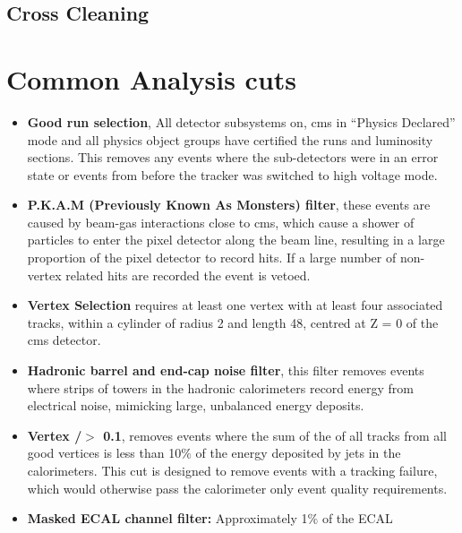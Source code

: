 \subsection{Cross Cleaning} %
\label{sub:cross_cleaning}

\section{Common Analysis cuts} %
\label{sec:common_analysis_cuts}



\begin{itemize}
\item \textbf{Good run selection}, All detector subsystems on, \ac{cms} in 
``Physics Declared'' mode and all physics object groups have certified the runs 
and luminosity sections. This removes any events where the sub-detectors were 
in an error state or events from before the tracker was switched to high 
voltage mode.
\item \textbf{P.K.A.M (Previously Known As Monsters) filter}, these events are 
caused by beam-gas interactions close to \ac{cms}, which cause a shower of 
particles to enter the pixel detector along the beam line, resulting in a large 
proportion of the pixel detector to record hits. If a large number of non-vertex related hits are recorded the event is vetoed.
\item \textbf{Vertex Selection} requires at least one vertex with at 
least four associated tracks, within a cylinder of radius \unit{2}{\cm} and 
length \unit{48}{\cm}, centred at Z = 0 of the \ac{cms} detector.
\item \textbf{Hadronic barrel and end-cap noise filter}, this filter removes 
events where strips of towers in the hadronic calorimeters record energy from 
electrical noise, mimicking large, unbalanced energy deposits.
\item \textbf{Vertex \PT/\HT $>$ 0.1}, removes events where the sum of the 
\PT of all tracks from all good vertices is less than 10$\%$ of the energy 
deposited by jets in the calorimeters. This cut is designed to remove events 
with a tracking failure, which would otherwise pass the calorimeter only event 
quality requirements.
\item\textbf{Masked ECAL channel filter:} Approximately 1$\%$ of the ECAL 

\end{itemize}
